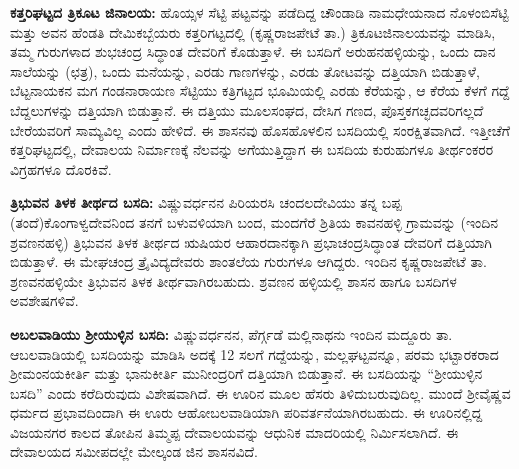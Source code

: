 \vskip 3pt

\textbf{ಕತ್ತರಿಘಟ್ಟದ ತ್ರಿಕೂಟ ಜಿನಾಲಯ:} ಹೊಯ್ಸಳ ಸೆಟ್ಟಿ ಪಟ್ಟವನ್ನು ಪಡೆದಿದ್ದ ಚೌಂಡಾಡಿ ನಾಮಧೇಯನಾದ ನೊಳಂಬಿಸೆಟ್ಟಿ ಮತ್ತು ಅವನ ಹೆಂಡತಿ ದೇಮಿಕಬ್ಬೆಯರು ಕತ್ತರಿಗಟ್ಟದಲ್ಲಿ (ಕೃಷ್ಣರಾಜಪೇಟೆ ತಾ.) ತ್ರಿಕೂಟಜಿನಾಲಯವನ್ನು ಮಾಡಿಸಿ, ತಮ್ಮ ಗುರುಗಳಾದ ಶುಭಚಂದ್ರ ಸಿದ್ಧಾಂತ ದೇವರಿಗೆ ಕೊಡುತ್ತಾಳೆ. ಈ ಬಸದಿಗೆ ಅರುಹನಹಳ್ಳಿಯನ್ನು, ಒಂದು ದಾನ ಸಾಲೆಯನ್ನು (ಛತ್ರ), ಒಂದು ಮನೆಯನ್ನು, ಎರಡು ಗಾಣಗಳನ್ನು, ಎರಡು ತೋಟವನ್ನು ದತ್ತಿಯಾಗಿ ಬಿಡುತ್ತಾಳೆ, ಬೆಟ್ಟನಾಯಕನ ಮಗ ಗಂಡನಾರಾಯಣ ಸೆಟ್ಟಿಯು ಕತ್ರಿಗಟ್ಟದ ಭೂಮಿಯಲ್ಲಿ ಎರಡು ಕೆರೆಯನ್ನು, ಆ ಕೆರೆಯ ಕೆಳಗೆ ಗದ್ದೆ ಬೆದ್ದಲುಗಳನ್ನು ದತ್ತಿಯಾಗಿ ಬಿಡುತ್ತಾನೆ. ಈ ದತ್ತಿಯು ಮೂಲಸಂಘದ, ದೇಸಿಗ ಗಣದ, ಪೊಸ್ತಕಗಚ್ಛದವರಿಗಲ್ಲದೆ ಬೇರೆಯವರಿಗೆ ಸಾಮ್ಯವಿಲ್ಲ ಎಂದು ಹೇಳಿದೆ. ಈ ಶಾಸನವು ಹೊಸಹೊಳಲಿನ ಬಸದಿಯಲ್ಲಿ ಸಂರಕ್ಷಿತವಾಗಿದೆ. ಇತ್ತೀಚೆಗೆ ಕತ್ತರಿಘಟ್ಟದಲ್ಲಿ, ದೇವಾಲಯ ನಿರ್ಮಾಣಕ್ಕೆ ನೆಲವನ್ನು ಅಗೆಯುತ್ತಿದ್ದಾಗ ಈ ಬಸದಿಯ ಕುರುಹುಗಳೂ ತೀರ್ಥಂಕರರ ವಿಗ್ರಹಗಳೂ ದೊರಕಿವೆ.

\vskip 3pt

\textbf{ತ್ರಿಭುವನ ತಿಳಕ ತೀರ್ಥದ ಬಸದಿ:} ವಿಷ್ಣುವರ್ಧನನ ಪಿರಿಯರಸಿ ಚಂದಲದೇವಿಯು ತನ್ನ ಬಪ್ಪ (ತಂದೆ)\break ಕೊಂಗಾಳ್ವದೇವನಿಂದ ತನಗೆ ಬಳುವಳಿಯಾಗಿ ಬಂದ, ಮಂದಗೆರೆ ಶ್ರಿತಿಯ ಕಾವನಹಳ್ಳಿ ಗ್ರಾಮವನ್ನು (ಇಂದಿನ ಶ್ರವಣನಹಳ್ಳಿ) ತ್ರಿಭುವನ ತಿಳಕ ತೀರ್ಥದ ಋಷಿಯರ ಆಹಾರದಾನಕ್ಕಾಗಿ ಪ್ರಭಾಚಂದ್ರಸಿದ್ಧಾಂತ ದೇವರಿಗೆ ದತ್ತಿಯಾಗಿ ಬಿಡುತ್ತಾಳೆ. ಈ ಮೇಘಚಂದ್ರ ತ್ರೈವಿದ್ಯದೇವರು ಶಾಂತಲೆಯ ಗುರುಗಳೂ ಆಗಿದ್ದರು. ಇಂದಿನ ಕೃಷ್ಣರಾಜಪೇಟೆ ತಾ. ಶ್ರಣವನಹಳ್ಳಿಯೇ ತ್ರಿಭುವನ ತಿಳಕ ತೀರ್ಥವಾಗಿರಬಹುದು. ಶ್ರವಣನ ಹಳ್ಳಿಯಲ್ಲಿ ಶಾಸನ ಹಾಗೂ ಬಸದಿಗಳ ಅವಶೇಷಗಳಿವೆ.

\vskip 3pt

\textbf{ಅಬಲವಾಡಿಯು ಶ‍್ರೀಯುಳ್ಳಿನ ಬಸದಿ:} ವಿಷ್ಣುವರ್ಧನನ, ಪೆರ್ಗ್ಗಡೆ ಮಲ್ಲಿನಾಥನು ಇಂದಿನ ಮದ್ದೂರು ತಾ. ಆಬಲವಾಡಿಯಲ್ಲಿ ಬಸದಿಯನ್ನು ಮಾಡಿಸಿ ಅದಕ್ಕೆ 12 ಸಲಗೆ ಗದ್ದೆಯನ್ನು, ಮಲ್ಲಘಟ್ಟವನ್ನೂ, ಪರಮ ಭಟ್ಟಾರಕರಾದ ಶ‍್ರೀಮಂನಯಕೀರ್ತಿ ಮತ್ತು ಭಾನುಕೀರ್ತಿ ಮುನೀಂದ್ರರಿಗೆ ದತ್ತಿಯಾಗಿ ಬಿಡುತ್ತಾನೆ. ಈ ಬಸದಿಯನ್ನು “ಶ‍್ರೀಯುಳ್ಳಿನ ಬಸದಿ” ಎಂದು ಕರೆದಿರುವುದು ವಿಶೇಷವಾಗಿದೆ. ಈ ಊರಿನ ಮೂಲ ಹೆಸರು ತಿಳಿದುಬರುವುದಿಲ್ಲ. ಮುಂದೆ ಶ‍್ರೀವೈಷ್ಣವ ಧರ್ಮದ ಪ್ರಭಾವದಿಂದಾಗಿ ಈ ಊರು ಆಹೋಬಲವಾಡಿಯಾಗಿ ಪರಿವರ್ತನೆಯಾಗಿರಬಹುದು. ಈ ಊರಿನಲ್ಲಿದ್ದ ವಿಜಯನಗರ ಕಾಲದ ತೋಪಿನ ತಿಮ್ಮಪ್ಪ ದೇವಾಲಯವನ್ನು ಆಧುನಿಕ ಮಾದರಿಯಲ್ಲಿ ನಿರ್ಮಿಸಲಾಗಿದೆ. ಈ ದೇವಾಲಯದ ಸಮೀಪದಲ್ಲೇ ಮೇಲ್ಕಂಡ ಜಿನ ಶಾಸನವಿದೆ.

\vskip 3pt

